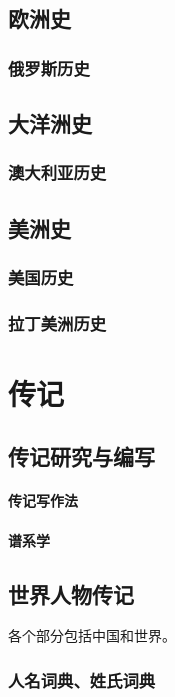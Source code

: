 \documentclass[UTF8]{../RepresentationUniverse}
\begin{document}
\section{欧洲史}
    \subsection{俄罗斯历史}


\section{大洋洲史}
    \subsection{澳大利亚历史}

\section{美洲史}
    \subsection{美国历史}
    \subsection{拉丁美洲历史}








\chapter{传记}
\section{传记研究与编写}
    \subsubsection{传记写作法}
    \subsubsection{谱系学}


\section{世界人物传记}
各个部分包括中国和世界。
    \subsection{人名词典、姓氏词典}
\end{document}
